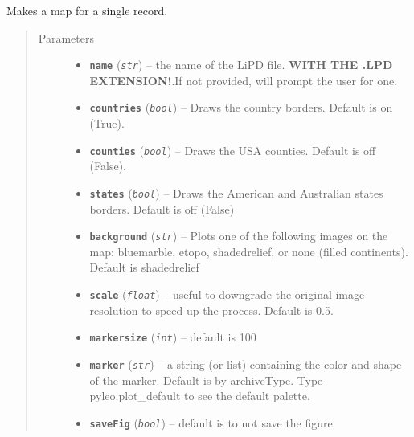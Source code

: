 \documentclass[letterpaper,10pt,english]{sphinxmanual}
\begin{document}
\begin{fulllineitems}
\begin{fulllineitems}
\label{Mapping:pyleoclim.Map.map_one}
Makes a map for a single record.
\begin{quote}\begin{description}
\item[{Parameters}] \leavevmode\begin{itemize}
\item {} 
\textbf{\texttt{name}} (\emph{\texttt{str}}) -- the name of the LiPD file. \textbf{WITH THE
.LPD EXTENSION!}.If not provided, will prompt the user for one.

\item {} 
\textbf{\texttt{countries}} (\emph{\texttt{bool}}) -- Draws the country borders. Default is on (True).

\item {} 
\textbf{\texttt{counties}} (\emph{\texttt{bool}}) -- Draws the USA counties. Default is off (False).

\item {} 
\textbf{\texttt{states}} (\emph{\texttt{bool}}) -- Draws the American and Australian states borders.
Default is off (False)

\item {} 
\textbf{\texttt{background}} (\emph{\texttt{str}}) -- Plots one of the following images on the map:
bluemarble, etopo, shadedrelief, or none (filled continents).
Default is shadedrelief

\item {} 
\textbf{\texttt{scale}} (\emph{\texttt{float}}) -- useful to downgrade the original image resolution
to speed up the process. Default is 0.5.

\item {} 
\textbf{\texttt{markersize}} (\emph{\texttt{int}}) -- default is 100

\item {} 
\textbf{\texttt{marker}} (\emph{\texttt{str}}) -- a string (or list) containing the color and shape of
the marker. Default is by archiveType. Type pyleo.plot\_default
to see the default palette.

\item {} 
\textbf{\texttt{saveFig}} (\emph{\texttt{bool}}) -- default is to not save the figure


\end{itemize}
\end{description}
\end{quote}
\end{fulllineitems}
\end{fulllineitems}
\end{document}
